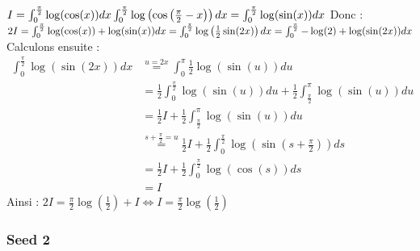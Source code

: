 \documentclass[11.5pt,french,table]{article}
\theoremstyle{exercice}
\newenvironment{packed_enum}{
\begin{enumerate}
  \setlength{\itemsep}{11pt}
  \setlength{\parskip}{0pt}
  \setlength{\parsep}{0pt}
}{\end{enumerate}}
\begin{document}
\begin{packed_enum}
    \item 
    $
    I = \int_0^\frac{\pi}{2}\log(\cos(x))dx  \\
    \int_0^\frac{\pi}{2}\log\left(\cos\left(\frac{\pi}{2}-x\right)\right)dx = 
    \int_0^\frac{\pi}{2}\log(\sin(x))dx\\
    $
    Donc :
    $
    2I = \int_0^\frac{\pi}{2} \log(\cos(x))+\log(\sin(x))dx = \int_0^\frac{\pi}{2} \log\left(\frac{1}{2}\sin(2x)\right)dx =\int_0^\frac{\pi}{2} -\log(2) + \log(\sin(2x))dx \\
    $
    Calculons ensuite :
    \begin{align*}
        \int_0^\frac{\pi}{2} \log(\sin(2x))dx &\overset{u=2x}{=} \int_0^\pi \frac{1}{2}\log(\sin(u))du\\ 
        &= \frac{1}{2}\int_0^{\frac{\pi}{2}} \log(\sin(u))du + \frac{1}{2}\int_{\frac{\pi}{2}}^\pi \log(\sin(u))du\\ 
        &= \frac{1}{2}I + \frac{1}{2}\int_{\frac{\pi}{2}}^\pi \log(\sin(u))du\\ 
        &\overset{s+\frac{\pi}{2}=u}{=} \frac{1}{2}I + \frac{1}{2} \int_0^\frac{\pi}{2} \log\left(\sin\left(s+\frac{\pi}{2}\right)\right)ds\\ 
        &= \frac{1}{2}I + \frac{1}{2} \int_0^\frac{\pi}{2} \log(\cos(s))ds\\
        &= I
    \end{align*}
    Ainsi :
    $
    2I = \frac{\pi}{2}\log\left(\frac{1}{2}\right) + I \iff I = \frac{\pi}{2}\log\left(\frac{1}{2}\right)
    $
\end{packed_enum}


\subsubsection{Seed 2}
\end{document}
